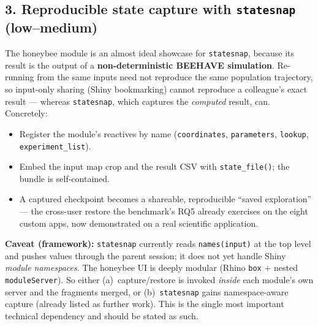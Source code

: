 \documentclass[12pt,a4paper]{article}
\begin{document}
\subsection{3. Reproducible state capture with \texttt{statesnap} (low--medium)}

The honeybee module is an almost ideal showcase for \texttt{statesnap}, because
its result is the output of a \textbf{non-deterministic BEEHAVE simulation}.
Re-running from the same inputs need not reproduce the same population trajectory,
so input-only sharing (Shiny bookmarking) cannot reproduce a colleague's exact
result --- whereas \texttt{statesnap}, which captures the \emph{computed} result,
can. Concretely:
\begin{itemize}[nosep]
  \item Register the module's reactives by name (\texttt{coordinates},
    \texttt{parameters}, \texttt{lookup}, \texttt{experiment\_list}).
  \item Embed the input map crop and the result CSV with \texttt{state\_file()};
    the bundle is self-contained.
  \item A captured checkpoint becomes a shareable, reproducible ``saved
    exploration'' --- the cross-user restore the benchmark's RQ5 already exercises
    on the eight custom apps, now demonstrated on a real scientific application.
\end{itemize}
\textbf{Caveat (framework):} \texttt{statesnap} currently reads
\texttt{names(input)} at the top level and pushes values through the parent
session; it does not yet handle Shiny \emph{module namespaces}. The honeybee UI is
deeply modular (Rhino \texttt{box} + nested \texttt{moduleServer}). So either
(a)~capture/restore is invoked \emph{inside} each module's own server and the
fragments merged, or (b)~\texttt{statesnap} gains namespace-aware capture (already
listed as further work). This is the single most important technical dependency
and should be stated as such.
\end{document}
